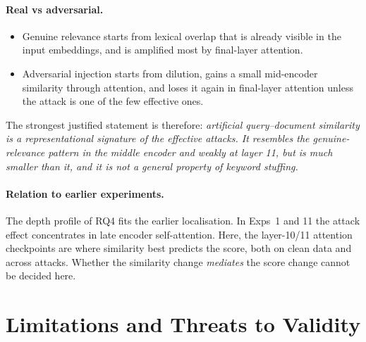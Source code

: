 \documentclass[11pt]{article}
\begin{document}
\paragraph{Real vs adversarial.}
\begin{itemize}[nosep]
  \item Genuine relevance starts from lexical overlap that is already visible in the
        input embeddings, and is amplified most by final-layer attention.
  \item Adversarial injection starts from dilution, gains a small mid-encoder
        similarity through attention, and loses it again in final-layer attention
        unless the attack is one of the few effective ones.
\end{itemize}
The strongest justified statement is therefore: \emph{artificial query--document
similarity is a representational signature of the effective attacks. It resembles the
genuine-relevance pattern in the middle encoder and weakly at layer 11, but is much
smaller than it, and it is not a general property of keyword stuffing.}

\paragraph{Relation to earlier experiments.} The depth profile of RQ4 fits the earlier
localisation. In Exps~1 and 11 the attack effect concentrates in late encoder
self-attention. Here, the layer-10/11 attention checkpoints are where similarity best
predicts the score, both on clean data and across attacks. Whether the similarity
change \emph{mediates} the score change cannot be decided here.

\section{Limitations and Threats to Validity}
\end{document}
